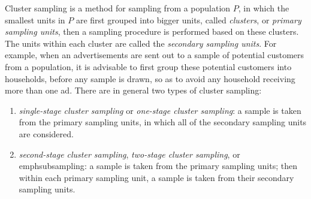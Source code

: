 \documentclass[12pt]{article}
\begin{document}
Cluster sampling is a method for sampling from a population $P$, in which the smallest units in $P$ are first grouped into bigger units, called \emph{clusters}, or \emph{primary sampling units}, then a sampling procedure is performed based on these clusters.  The units within each cluster are called the \emph{secondary sampling units}.  For example, when an advertisements are sent out to a sample of
potential customers from a population, it is advisable to first group these potential customers into households, before any sample is drawn, so as to avoid any household receiving more than one ad. There are in general two types of cluster sampling:
\begin{enumerate}
\item \emph{single-stage cluster sampling} or \emph{one-stage cluster sampling}: a sample is taken from the primary sampling units, in which all of the secondary sampling units are considered.
\item \emph{second-stage cluster sampling}, \emph{two-stage cluster sampling}, or emph{subsampling}: a sample is taken from the primary sampling units; then within each primary sampling unit, a sample is taken from their secondary sampling units.
\end{enumerate}
\end{document}
